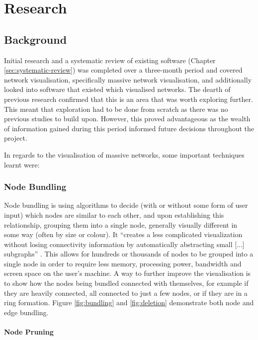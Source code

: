 \documentclass[../dissertation.tex]{subfiles}
\begin{document}
\chapter{Research}
\label{sec:research}

\section{Background}
\label{sec:background}

Initial research and a systematic review of existing software (Chapter \ref{sec:systematic-review}) was completed over a three-month period and covered network visualisation, specifically massive network visualisation, and additionally looked into software that existed which visualised networks. The dearth of previous research confirmed that this is an area that was worth exploring further. This meant that exploration had to be done from scratch as there was no previous studies to build upon. However, this proved advantageous as the wealth of information gained during this period informed future decisions throughout the project.

In regards to the visualisation of massive networks, some important techniques learnt were:

\subsection{Node Bundling}
\label{sec:node_bundling}

Node bundling is using algorithms to decide (with or without some form of user input) which nodes are similar to each other, and upon establishing this relationship, grouping them into a single node, generally visually different in some way (often by size or colour). It ``creates a less complicated visualization without losing connectivity information by automatically abstracting small [...] subgraphs'' \cite{six2003effective}. This allows for hundreds or thousands of nodes to be grouped into a single node in order to require less memory, processing power, bandwidth and screen space on the user's machine. A way to further improve the visualisation is to show how the nodes being bundled connected with themselves, for example if they are heavily connected, all connected to just a few nodes, or if they are in a ring formation. Figure \ref{fig:bundling} and \ref{fig:deletion} demonstrate both node and edge bundling.

\subsubsection{Node Pruning}
\label{sec:node-pruning}
\end{document}

